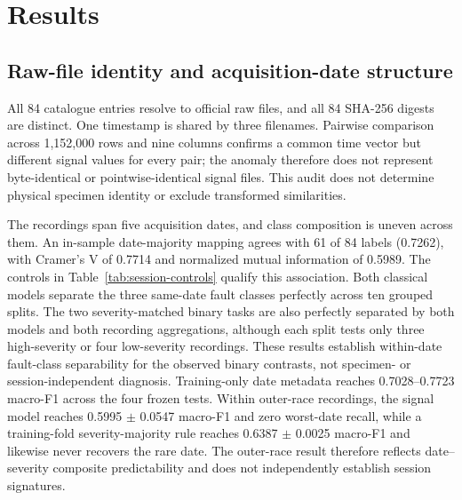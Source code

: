 \documentclass[machines,article,submit,oneauthor]{Definitions/mdpi}
\begin{document}
\section{Results}
\subsection{Raw-file identity and acquisition-date structure}
All 84 catalogue entries resolve to official raw files, and all 84 SHA-256 digests are distinct. One timestamp is shared by three filenames. Pairwise comparison across 1,152,000 rows and nine columns confirms a common time vector but different signal values for every pair; the anomaly therefore does not represent byte-identical or pointwise-identical signal files. This audit does not determine physical specimen identity or exclude transformed similarities.

The recordings span five acquisition dates, and class composition is uneven across them. An in-sample date-majority mapping agrees with 61 of 84 labels (0.7262), with Cramer's V of 0.7714 and normalized mutual information of 0.5989. The controls in Table~\ref{tab:session-controls} qualify this association. Both classical models separate the three same-date fault classes perfectly across ten grouped splits. The two severity-matched binary tasks are also perfectly separated by both models and both recording aggregations, although each split tests only three high-severity or four low-severity recordings. These results establish within-date fault-class separability for the observed binary contrasts, not specimen- or session-independent diagnosis. Training-only date metadata reaches 0.7028--0.7723 macro-F1 across the four frozen tests. Within outer-race recordings, the signal model reaches 0.5995 $\pm$ 0.0547 macro-F1 and zero worst-date recall, while a training-fold severity-majority rule reaches 0.6387 $\pm$ 0.0025 macro-F1 and likewise never recovers the rare date. The outer-race result therefore reflects date--severity composite predictability and does not independently establish session signatures.
\end{document}

